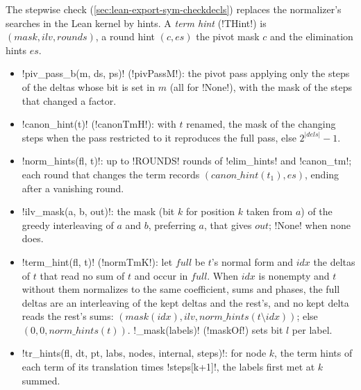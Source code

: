 {{{The stepwise check (\cref{sec:lean-export-sym-checkdecls}) replaces the normalizer's searches in
the Lean kernel by hints. A \emph{term hint} (\lexlean!THint!) is $(\mathit{mask}, \mathit{ilv},
\mathit{rounds})$, a round hint $(c, es)$ the pivot mask $c$ and the elimination hints $es$.
\begin{itemize}
\item \lexpy!piv_pass_b(m, ds, ps)! (\lexlean!pivPassM!): the pivot pass applying only the steps of
the deltas whose bit is set in $m$ (all for \lexpy!None!), with the mask of the steps that changed
a factor.
\item \lexpy!canon_hint(t)! (\lexlean!canonTmH!): with $t$ renamed, the mask of the changing steps
when the pass restricted to it reproduces the full pass, else $2^{|\mathit{dels}|}-1$.
\item \lexpy!norm_hints(fl, t)!: up to \lexpy!ROUNDS! rounds of \lexpy!elim_hints! and
\lexpy!canon_tm!; each round that changes the term records $(\mathit{canon\_hint}(t_1), es)$,
ending after a vanishing round.
\item \lexpy!ilv_mask(a, b, out)!: the mask (bit $k$ for position $k$ taken from $a$) of the greedy
interleaving of $a$ and $b$, preferring $a$, that gives $out$; \lexpy!None! when none does.
\item \lexpy!term_hint(fl, t)! (\lexlean!normTmK!): let $\mathit{full}$ be $t$'s normal form and
$\mathit{idx}$ the deltas of $t$ that read no sum of $t$ and occur in $\mathit{full}$. When
$\mathit{idx}$ is nonempty and $t$ without them normalizes to the same coefficient, sums and
phases, the full deltas are an interleaving of the kept deltas and the rest's, and no kept delta
reads the rest's sums: $(\mathit{mask}(\mathit{idx}), \mathit{ilv}, \mathit{norm\_hints}(t
\setminus \mathit{idx}))$; else $(0, 0, \mathit{norm\_hints}(t))$. \lexpy!_mask(labels)!
(\lexlean!maskOf!) sets bit $l$ per label.
\item \lexpy!tr_hints(fl, dt, pt, labs, nodes, internal, steps)!: for node $k$, the term hints of
each term of its translation times \lexpy!steps[k+1]!, the labels first met at $k$ summed.
\end{itemize}

}}}
